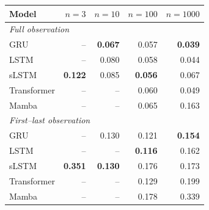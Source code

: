 \begin{tabular}{lrrrr}
\toprule
Model & $n{=}3$ & $n{=}10$ & $n{=}100$ & $n{=}1000$ \\
\midrule
\multicolumn{5}{l}{\emph{Full observation}} \\
GRU & -- & \textbf{0.067} & 0.057 & \textbf{0.039} \\
LSTM & -- & 0.080 & 0.058 & 0.044 \\
sLSTM & \textbf{0.122} & 0.085 & \textbf{0.056} & 0.067 \\
Transformer & -- & -- & 0.060 & 0.049 \\
Mamba & -- & -- & 0.065 & 0.163 \\
\midrule
\multicolumn{5}{l}{\emph{First--last observation}} \\
GRU & -- & 0.130 & 0.121 & \textbf{0.154} \\
LSTM & -- & -- & \textbf{0.116} & 0.162 \\
sLSTM & \textbf{0.351} & \textbf{0.130} & 0.176 & 0.173 \\
Transformer & -- & -- & 0.129 & 0.199 \\
Mamba & -- & -- & 0.178 & 0.339 \\
\bottomrule
\end{tabular}
